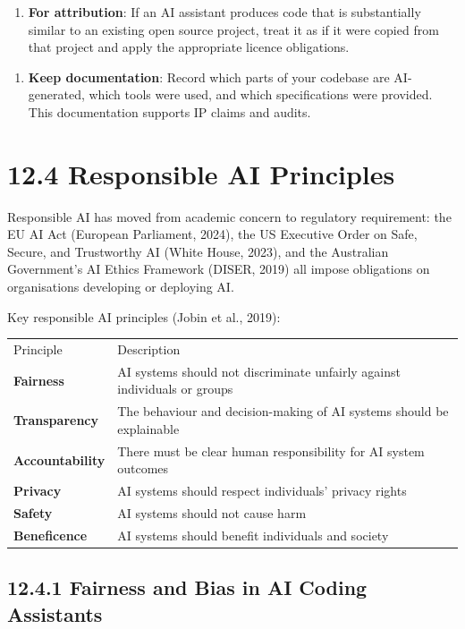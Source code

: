 \documentclass[11pt,a4paper]{book}
\begin{document}
\begin{enumerate}
  \item \textbf{For attribution}: If an AI assistant produces code that is substantially similar to an existing open source project, treat it as if it were copied from that project and apply the appropriate licence obligations.
\end{enumerate}

\begin{enumerate}
  \item \textbf{Keep documentation}: Record which parts of your codebase are AI-generated, which tools were used, and which specifications were provided. This documentation supports IP claims and audits.
\end{enumerate}

\medskip

\section{12.4 Responsible AI Principles}

Responsible AI has moved from academic concern to regulatory requirement: the EU AI Act (European Parliament, 2024), the US Executive Order on Safe, Secure, and Trustworthy AI (White House, 2023), and the Australian Government's AI Ethics Framework (DISER, 2019) all impose obligations on organisations developing or deploying AI.

Key responsible AI principles (Jobin et al., 2019):

\begin{tabular}{ll}
\hline
Principle & Description \\
\textbf{Fairness} & AI systems should not discriminate unfairly against individuals or groups \\
\textbf{Transparency} & The behaviour and decision-making of AI systems should be explainable \\
\textbf{Accountability} & There must be clear human responsibility for AI system outcomes \\
\textbf{Privacy} & AI systems should respect individuals' privacy rights \\
\textbf{Safety} & AI systems should not cause harm \\
\textbf{Beneficence} & AI systems should benefit individuals and society \\
\hline
\end{tabular}

\subsection{12.4.1 Fairness and Bias in AI Coding Assistants}
\end{document}
